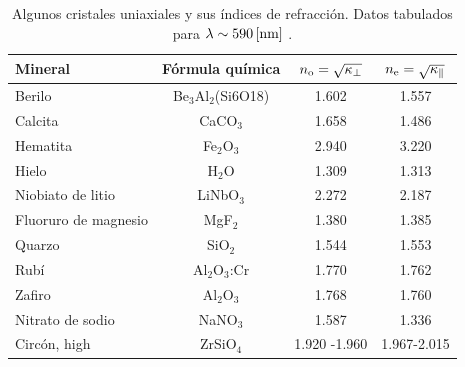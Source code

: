 \begin{table}[!h]
\begin{center}
\begin{tabular}{l c |c| c}
Mineral 		& 	Fórmula química 	&	$n_{\rm o}=\sqrt{\kappa_\perp}$	& 	$n_{\rm e}=\sqrt{\kappa_\parallel}$
\\
\hline\hline
Berilo 			& Be$_3$Al$_2$(Si6O18)	&	1.602	& 	1.557	
\\
Calcita 		&	CaCO$_3$  	&	1.658	& 	1.486	
\\
Hematita 		&	Fe$_2$O$_3$	&	2.940	& 	3.220	
\\
Hielo 			&	H$_2$O 		&	1.309	&	1.313	
\\
Niobiato de litio 	&	LiNbO$_3$	&	2.272	& 	2.187	
\\
Fluoruro de magnesio 	&	MgF$_2$		&	1.380	& 	1.385	
\\
Quarzo 			&	SiO$_2$		&	1.544	& 	1.553	
\\
Rubí 			& Al$_2$O$_3$:Cr	&	1.770 	&	1.762	
\\
Zafiro	 		&	Al$_2$O$_3$	&	1.768	& 	1.760	
\\
Nitrato de sodio	&	NaNO$_3$	&	1.587	& 	1.336	
\\
Circón, high 		&	ZrSiO$_4$	&	1.920 -1.960	&  1.967-2.015	
\end{tabular}
\caption{Algunos cristales uniaxiales y sus índices de refracción. Datos tabulados para $\lambda\sim 590\,{\rm [nm]}$ \cite{hyper}.}
\end{center}
\end{table}

